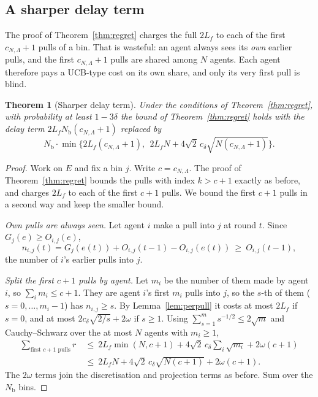 \documentclass[11pt]{article}
\newtheorem{theorem}{Theorem}
\theoremstyle{definition}
\newcommand{\Nb}{N_{\mathrm b}}
\begin{document}
\subsection{A sharper delay term}

The proof of Theorem~\ref{thm:regret} charges the full $2L_f$ to each of the first $c_{N,\Lambda}+1$ pulls of a bin.
That is wasteful: an agent always sees its \emph{own} earlier pulls, and the first $c_{N,\Lambda}+1$ pulls are shared
among $N$ agents. Each agent therefore pays a UCB-type cost on its own share, and only its very first pull is blind.

\begin{theorem}[Sharper delay term]\label{thm:sharp}
Under the conditions of Theorem~\ref{thm:regret}, with probability at least $1-3\delta$ the bound of
Theorem~\ref{thm:regret} holds with the delay term $2L_f\Nb(c_{N,\Lambda}+1)$ replaced by
\[
\Nb\cdot\min\Big\{2L_f(c_{N,\Lambda}+1),\ \ 2L_fN+4\sqrt2\,c_\delta\sqrt{N(c_{N,\Lambda}+1)}\Big\}.
\]
\end{theorem}
\begin{proof}
Work on $E$ and fix a bin $j$. Write $c=c_{N,\Lambda}$. The proof of Theorem~\ref{thm:regret} bounds the pulls with
index $k>c+1$ exactly as before, and charges $2L_f$ to each of the first $c+1$ pulls. We bound the first $c+1$ pulls
in a second way and keep the smaller bound.

\emph{Own pulls are always seen.} Let agent $i$ make a pull into $j$ at round $t$. Since $G_j(e)\ge O_{i,j}(e)$,
\[
n_{i,j}(t)=G_j(e(t))+O_{i,j}(t-1)-O_{i,j}(e(t))\ \ge\ O_{i,j}(t-1),
\]
the number of $i$'s earlier pulls into $j$.

\emph{Split the first $c+1$ pulls by agent.} Let $m_i$ be the number of them made by agent $i$, so $\sum_im_i\le c+1$.
They are agent $i$'s first $m_i$ pulls into $j$, so the $s$-th of them ($s=0,\dots,m_i-1$) has $n_{i,j}\ge s$. By
Lemma~\ref{lem:perpull} it costs at most $2L_f$ if $s=0$, and at most $2c_\delta\sqrt{2/s}+2\omega$ if $s\ge1$. Using
$\sum_{s=1}^{m}s^{-1/2}\le2\sqrt m$ and Cauchy--Schwarz over the at most $N$ agents with $m_i\ge1$,
\begin{align*}
\sum_{\text{first }c+1\text{ pulls}}r\ &\le\ 2L_f\min(N,c+1)+4\sqrt2\,c_\delta\sum_i\sqrt{m_i}+2\omega(c+1)\\
&\le\ 2L_fN+4\sqrt2\,c_\delta\sqrt{N(c+1)}+2\omega(c+1).
\end{align*}
The $2\omega$ terms join the discretisation and projection terms as before. Sum over the $\Nb$ bins.
\end{proof}
\end{document}
